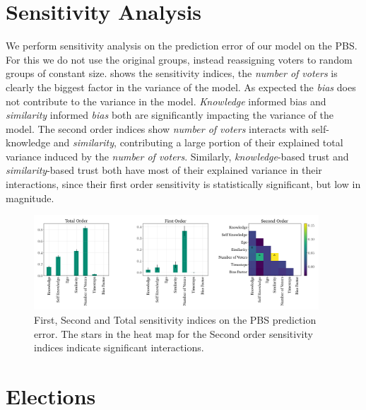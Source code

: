 
\section{Sensitivity Analysis} We perform sensitivity analysis on the
prediction error of our model on the PBS. For this we do not use the original
groups, instead reassigning voters to random groups of constant size.
 shows the sensitivity indices, the \textit{number of voters}
is clearly the biggest factor in the variance of the model. As expected the
\textit{bias} does not contribute to the variance in the model. \textit{Knowledge} informed bias
and\textit{ similarity} informed \textit{bias} both are significantly impacting the variance of
the model. The second order indices show \textit{number of voters} interacts with
self-knowledge and\textit{ similarity}, contributing a large portion of their explained
total variance induced by the \textit{number of voters}. Similarly,\textit{ knowledge}-based
trust and\textit{ similarity}-based trust both have most of their explained variance in
their interactions, since their first order sensitivity is statistically
significant, but low in magnitude.



\begin{figure}[h]
	\begin{center}
		\includegraphics[width=0.95\textwidth]{Figures/senstivity_analysis.png}
	\end{center}
	\caption{First, Second and Total sensitivity indices on the PBS prediction error. The stars in the heat map for the Second order sensitivity indices indicate significant interactions. }\label{fig:sensitivty_pbs}
\end{figure}


\section{Elections}

